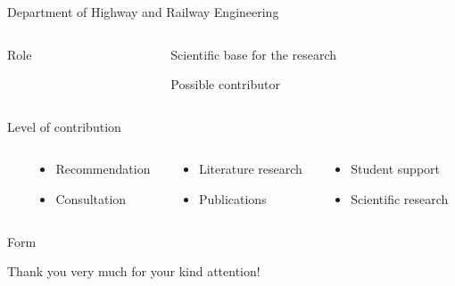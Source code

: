 \documentclass[aspectratio=169]{beamer}
\begin{document}
\begin{frame}{Department of Highway and Railway Engineering}
    \pause
    \begin{columns}[t]
        \begin{column}{0.2\textwidth}
            Role
        \end{column}
        \pause
        \begin{column}{0.7\textwidth}
            \raggedright
            Scientific base for the research

            Possible contributor
        \end{column}
    \end{columns}
    \vspace*{1cm}
    \pause
    \begin{columns}
        \begin{column}{0.2\textwidth}
            Level of contribution
        \end{column}
        \begin{column}{0.7\textwidth}
        \end{column}
    \end{columns}
    \pause
    \begin{columns}
        \begin{column}{0.15\textwidth}
        \end{column}
        \begin{column}[b]{0.25\textwidth}
            \begin{itemize}
                \item Recommendation
                \item Consultation
            \end{itemize}
        \end{column}
        \pause
        \begin{column}[c]{0.28\textwidth}
            \begin{itemize}
                \item Literature research
                \item Publications
            \end{itemize}
        \end{column}
        \pause
        \begin{column}[t]{0.25\textwidth}
            \begin{itemize}
                \item Student support
                \item Scientific research
            \end{itemize}
        \end{column}
    \end{columns}
\end{frame}

\begin{frame}{Form}

\end{frame}

\begin{frame}
    \thispagestyle{empty}
    \centering \Large
    Thank you very much for your kind attention!
\end{frame}
\end{document}
